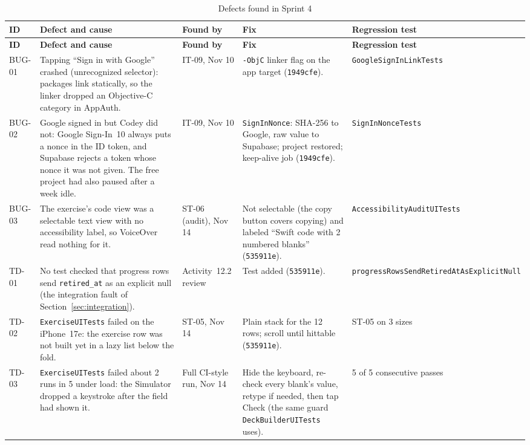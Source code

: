 \documentclass[12pt,letterpaper]{article}
\begin{document}
\begin{xltabular}{\textwidth}{@{}L{1.1cm} Y L{2.4cm} Y L{2.2cm}@{}}
\caption{Defects found in Sprint 4}\label{tab:defects}\\
\toprule
\textbf{ID} & \textbf{Defect and cause} & \textbf{Found by} & \textbf{Fix} & \textbf{Regression test} \\
\midrule
\endfirsthead
\toprule
\textbf{ID} & \textbf{Defect and cause} & \textbf{Found by} & \textbf{Fix} & \textbf{Regression test} \\
\midrule
\endhead
\bottomrule
\endfoot
BUG-01 & Tapping ``Sign in with Google'' crashed (unrecognized selector): packages link statically, so the linker dropped an Objective-C category in AppAuth. & IT-09, Nov 10 & \texttt{-ObjC} linker flag on the app target (\texttt{1949cfe}). & \texttt{GoogleSignInLinkTests} \\
BUG-02 & Google signed in but Codey did not: Google Sign-In~10 always puts a nonce in the ID token, and Supabase rejects a token whose nonce it was not given. The free project had also paused after a week idle. & IT-09, Nov 10 & \texttt{SignInNonce}: SHA-256 to Google, raw value to Supabase; project restored; keep-alive job (\texttt{1949cfe}). & \texttt{SignInNonceTests} \\
BUG-03 & The exercise's code view was a selectable text view with no accessibility label, so VoiceOver read nothing for it. & ST-06 (audit), Nov 14 & Not selectable (the copy button covers copying) and labeled ``Swift code with 2 numbered blanks'' (\texttt{535911e}). & \texttt{AccessibilityAuditUITests} \\
TD-01 & No test checked that progress rows send \texttt{retired\_at} as an explicit null (the integration fault of Section~\ref{sec:integration}). & Activity~12.2 review & Test added (\texttt{535911e}). & \texttt{progressRowsSendRetiredAtAsExplicitNull} \\
TD-02 & \texttt{ExerciseUITests} failed on the iPhone~17e: the exercise row was not built yet in a lazy list below the fold. & ST-05, Nov 14 & Plain stack for the 12 rows; scroll until hittable (\texttt{535911e}). & ST-05 on 3 sizes \\
TD-03 & \texttt{ExerciseUITests} failed about 2 runs in 5 under load: the Simulator dropped a keystroke after the field had shown it. & Full CI-style run, Nov 14 & Hide the keyboard, re-check every blank's value, retype if needed, then tap Check (the same guard \texttt{DeckBuilderUITests} uses). & 5 of 5 consecutive passes \\
\end{xltabular}
\end{document}
